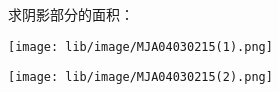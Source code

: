 求阴影部分的面积：

\begin{center}

    \texttt{[image: lib/image/MJA04030215(1).png]}\qquad\qquad\qquad

    \texttt{[image: lib/image/MJA04030215(2).png]}

\end{center}



